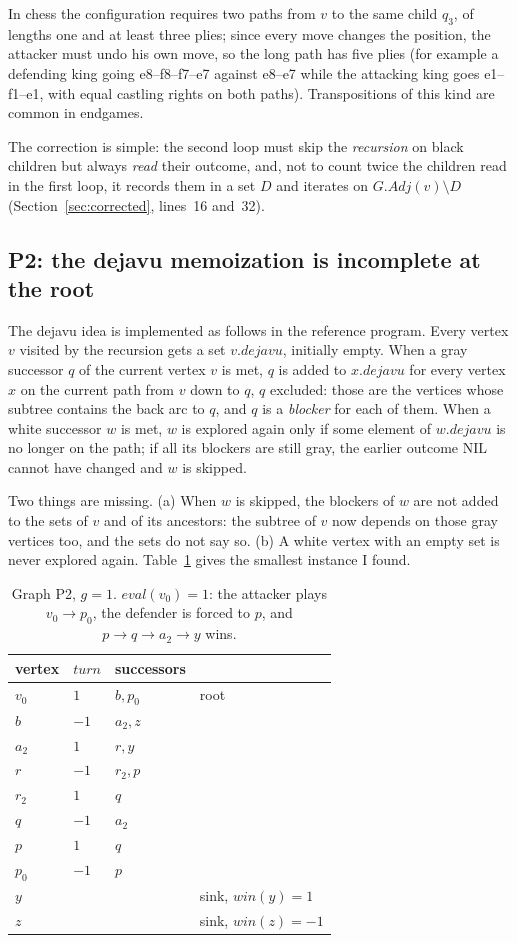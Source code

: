 \documentclass{article}
\theoremstyle{plain}
\theoremstyle{definition}
\theoremstyle{remark}
\newcommand{\Adj}{\mathit{Adj}}
\newcommand{\eval}{\mathit{eval}}
\newcommand{\turn}{\mathit{turn}}
\newcommand{\win}{\mathit{win}}
\newcommand{\dejv}{\mathit{dejavu}}
\newcommand{\NIL}{\ensuremath{\mathrm{NIL}}}
\begin{document}
In chess the configuration requires two paths from $v$ to the same child $q_3$, of lengths one and at least three plies; since every move changes the position, the attacker must undo his own move, so the long path has five plies (for example a defending king going e8--f8--f7--e7 against e8--e7 while the attacking king goes e1--f1--e1, with equal castling rights on both paths). Transpositions of this kind are common in endgames.

The correction is simple: the second loop must skip the \emph{recursion} on black children but always \emph{read} their outcome, and, not to count twice the children read in the first loop, it records them in a set $D$ and iterates on $G.\Adj(v) \setminus D$ (Section~\ref{sec:corrected}, lines~16 and~32).

\subsection{P2: the dejavu memoization is incomplete at the root}\label{sec:p2}

The dejavu idea is implemented as follows in the reference program. Every vertex $v$ visited by the recursion gets a set $v.\dejv$, initially empty. When a gray successor $q$ of the current vertex $v$ is met, $q$ is added to $x.\dejv$ for every vertex $x$ on the current path from $v$ down to $q$, $q$ excluded: those are the vertices whose subtree contains the back arc to $q$, and $q$ is a \emph{blocker} for each of them. When a white successor $w$ is met, $w$ is explored again only if some element of $w.\dejv$ is no longer on the path; if all its blockers are still gray, the earlier outcome \NIL{} cannot have changed and $w$ is skipped.

Two things are missing. (a) When $w$ is skipped, the blockers of $w$ are not added to the sets of $v$ and of its ancestors: the subtree of $v$ now depends on those gray vertices too, and the sets do not say so. (b) A white vertex with an empty set is never explored again. Table~\ref{tab:p2} gives the smallest instance I found.

\begin{table}[h]\centering\small
\begin{tabular}{llll}
\toprule
vertex & $\turn$ & successors & \\
\midrule
$v_0$ & $1$ & $b, p_0$ & root \\
$b$ & $-1$ & $a_2, z$ & \\
$a_2$ & $1$ & $r, y$ & \\
$r$ & $-1$ & $r_2, p$ & \\
$r_2$ & $1$ & $q$ & \\
$q$ & $-1$ & $a_2$ & \\
$p$ & $1$ & $q$ & \\
$p_0$ & $-1$ & $p$ & \\
$y$ & & & sink, $\win(y) = 1$ \\
$z$ & & & sink, $\win(z) = -1$ \\
\bottomrule
\end{tabular}
\caption{Graph P2, $g = 1$. $\eval(v_0) = 1$: the attacker plays $v_0 \to p_0$, the defender is forced to $p$, and $p \to q \to a_2 \to y$ wins.}
\label{tab:p2}
\end{table}
\end{document}
